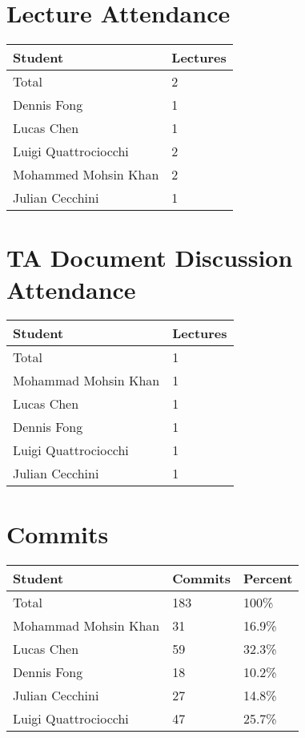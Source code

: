 \documentclass{article}
\begin{document}
\section{Lecture Attendance}

\begin{table}[H]
\centering
\begin{tabular}{ll}
\toprule
\textbf{Student} & \textbf{Lectures}\\
\midrule
Total & 2\\
Dennis Fong & 1\\
Lucas Chen & 1\\
Luigi Quattrociocchi & 2\\
Mohammed Mohsin Khan & 2\\
Julian Cecchini & 1\\
\bottomrule
\end{tabular}
\end{table}

\section{TA Document Discussion Attendance}

\begin{table}[H]
\centering
\begin{tabular}{ll}
\toprule
\textbf{Student} & \textbf{Lectures}\\
\midrule
Total & 1\\
Mohammad Mohsin Khan & 1\\
Lucas Chen & 1\\
Dennis Fong & 1\\
Luigi Quattrociocchi & 1\\
Julian Cecchini & 1\\
\bottomrule
\end{tabular}
\end{table}

\section{Commits}


\begin{table}[H]
\centering
\begin{tabular}{lll}
\toprule
\textbf{Student} & \textbf{Commits} & \textbf{Percent}\\
\midrule
Total & 183 & 100\% \\
Mohammad Mohsin Khan & 31 & 16.9\% \\
Lucas Chen & 59 & 32.3\% \\
Dennis Fong & 18 & 10.2\% \\
Julian Cecchini & 27 & 14.8\% \\
Luigi Quattrociocchi & 47 & 25.7\% \\
\bottomrule
\end{tabular}
\end{table}
\end{document}
